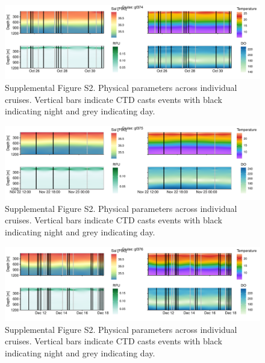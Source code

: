 \documentclass[
]{article}
\begin{document}
\begin{figure}

{\centering \includegraphics[width=1\textwidth,height=\textheight]{index_files/figure-pdf/unnamed-chunk-19-5.pdf}

}

\caption{Supplemental Figure S2. Physical parameters across individual
cruises. Vertical bars indicate CTD casts events with black indicating
night and grey indicating day.}

\end{figure}

\begin{figure}

{\centering \includegraphics[width=1\textwidth,height=\textheight]{index_files/figure-pdf/unnamed-chunk-19-6.pdf}

}

\caption{Supplemental Figure S2. Physical parameters across individual
cruises. Vertical bars indicate CTD casts events with black indicating
night and grey indicating day.}

\end{figure}

\begin{figure}

{\centering \includegraphics[width=1\textwidth,height=\textheight]{index_files/figure-pdf/unnamed-chunk-19-7.pdf}

}

\caption{Supplemental Figure S2. Physical parameters across individual
cruises. Vertical bars indicate CTD casts events with black indicating
night and grey indicating day.}

\end{figure}
\end{document}
